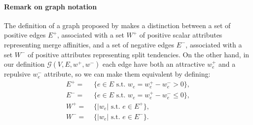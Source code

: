 \paragraph{Remark on graph notation} The definition of a graph proposed by \cite{wolf2018mutex} makes a distinction between a set of positive edges $E^+$, associated with a set $W^+$ of positive scalar attributes representing merge affinities, and a set of negative edges $E^-$, associated with a set $W^-$ of positive attributes representing split tendencies. On the other hand, in our definition $\mathcal{G}(V,E,w^+,w^-)$ each edge have both an attractive $w_e^+$ and a repulsive $w_e^-$ attribute, so we can make them equivalent by defining:
\begin{align}
E^+ =&\,\, \{ e \in E \,\,\text{s.t.} \,\,w_e = w_e^+ - w_e^- > 0\}, \\
E^- =&\,\, \{ e \in E \,\,\text{s.t.}\,\, w_e = w_e^+ - w_e^- \leq 0\}, \\
W^+ =&\,\, \{ |w_e| \,\,\text{s.t.}\,\, e \in E^+\},\\
 W^- =&\,\, \{ |w_e| \,\,\text{s.t.}\,\, e \in E^-\}.
\end{align}

